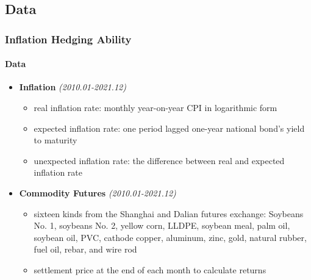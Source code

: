 \documentclass[
	11pt, %
]{beamer}
\begin{document}
\subsection{Data}
\begin{frame}
\frametitle{Inflation Hedging Ability}
\framesubtitle{Data}
\begin{itemize}
\item \textbf{Inflation} \textit{(2010.01-2021.12)}
    \begin{itemize}
    \item real inflation rate: monthly year-on-year CPI in logarithmic form\\
    \item expected inflation rate: one period lagged one-year national bond’s yield to maturity 
    \item unexpected inflation rate: the difference between real and expected inflation rate
    \end{itemize}
\bigskip
\item \textbf{Commodity Futures} \textit{(2010.01-2021.12)}
    \begin{itemize}
    \item sixteen kinds from the Shanghai and Dalian futures exchange: Soybeans No. 1, soybeans No. 2, yellow corn, LLDPE, soybean meal, palm oil, soybean oil, PVC, cathode copper, aluminum, zinc, gold, natural rubber, fuel oil, rebar, and wire rod\\
    \item settlement price at the end of each month to calculate returns\\
    \end{itemize}
\end{itemize}
\end{frame}
\end{document}

